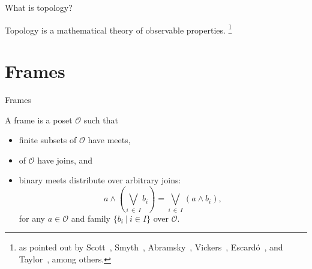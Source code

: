 \documentclass[xcolor={dvipsnames}]{beamer}
\begin{document}
\begin{frame}{What is topology?}
  \huge
  \begin{center}
    Topology is a mathematical theory of \alert{observable} properties.%
    \footnote{%
      as pointed out by Scott~\cite{scott-original}, Smyth~\cite{smyth-handbook},
      Abramsky~\cite{abramsky-thesis}, Vickers~\cite{vickers},
      Escardó~\cite{synthetic-topology}, and Taylor~\cite{taylor-asd}, among others.
    }
  \end{center}

\end{frame}

\section{Frames}

\begin{frame}{Frames}
  \large
  \vspace{1.5em}

  A \alert{frame} is a poset $\mathcal{O}$ such that
  \begin{itemize}
    \item \alert{finite subsets} of $\mathcal{O}$ have \alert{meets},
    \item {} of $\mathcal{O}$ have \alert{joins},
      and
    \item binary meets distribute over arbitrary joins:
      \begin{equation*}
        a \wedge \left( \bigvee_{i~\in~I} b_i \right) = \bigvee_{i~\in~I} \left( a \wedge b_i \right),
      \end{equation*}
      for any $a \in \mathcal{O}$ and family $\{ b_i ~|~ i \in I \}$ over $\mathcal{O}$.
  \end{itemize}

  \vspace{1em}

\end{frame}
\end{document}
